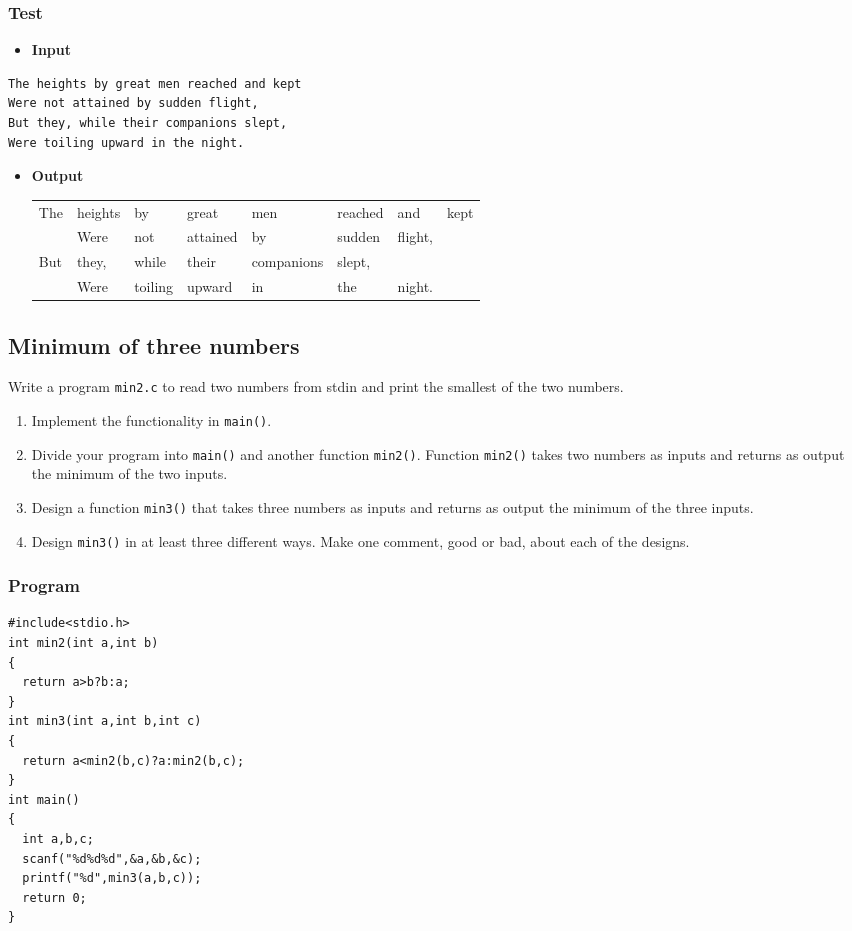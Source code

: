 \documentclass[11pt]{article}
\begin{document}
\subsubsection*{Test}
\label{sec-1-2-2}
\begin{itemize}
\item \textbf{Input}
\end{itemize}
\begin{verbatim}
The heights by great men reached and kept
Were not attained by sudden flight,
But they, while their companions slept,
Were toiling upward in the night.
\end{verbatim}

\begin{itemize}
\item \textbf{Output}
\begin{center}
\begin{tabular}{llllllll}
The & heights & by & great & men & reached & and & kept\\
 & Were & not & attained & by & sudden & flight, & \\
But & they, & while & their & companions & slept, &  & \\
 & Were & toiling & upward & in & the & night. & \\
\end{tabular}
\end{center}
\end{itemize}

\subsection*{Minimum of three numbers}
\label{sec-1-3}
Write a program \texttt{min2.c} to read two numbers from stdin and print
the smallest of the two numbers.
\begin{enumerate}
\item Implement the functionality in \texttt{main()}.
\item Divide your program into \texttt{main()} and another function
\texttt{min2()}. Function \texttt{min2()} takes two numbers as inputs and
returns as output the minimum of the two inputs.
\item Design a function \texttt{min3()} that takes three numbers as inputs
and returns as output the minimum of the three inputs.
\item Design \texttt{min3()} in at least three different ways. Make one
comment, good or bad, about each of the designs.
\end{enumerate}
\subsubsection*{Program}
\label{sec-1-3-1}
\begin{verbatim}
#include<stdio.h>
int min2(int a,int b)
{
  return a>b?b:a;
}
int min3(int a,int b,int c)
{
  return a<min2(b,c)?a:min2(b,c);
}
int main()
{
  int a,b,c;
  scanf("%d%d%d",&a,&b,&c);
  printf("%d",min3(a,b,c));
  return 0;
}
\end{verbatim}
\end{document}
